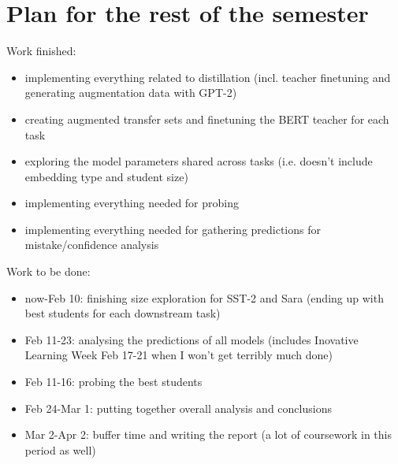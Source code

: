 \documentclass[bsc,frontabs,twoside,singlespacing,parskip,deptreport]{infthesis}
\begin{document}
\chapter{Plan for the rest of the semester}{
  Work finished:
  \begin{itemize}
    \item implementing everything related to distillation (incl. teacher finetuning and generating augmentation data with GPT-2)
    \item creating augmented transfer sets and finetuning the BERT teacher for each task
    \item exploring the model parameters shared across tasks (i.e. doesn't include embedding type and student size)
    \item implementing everything needed for probing
    \item implementing everything needed for gathering predictions for mistake/confidence analysis
  \end{itemize}

  Work to be done:
  \begin{itemize}
    \item now-Feb 10: finishing size exploration for SST-2 and Sara (ending up with best students for each downstream task)
    \item Feb 11-23: analysing the predictions of all models (includes Inovative Learning Week Feb 17-21 when I won't get terribly much done)
    \item Feb 11-16: probing the best students
    \item Feb 24-Mar 1: putting together overall analysis and conclusions
    \item Mar 2-Apr 2: buffer time and writing the report (a lot of coursework in this period as well)
  \end{itemize}
}




\appendix
\end{document}
